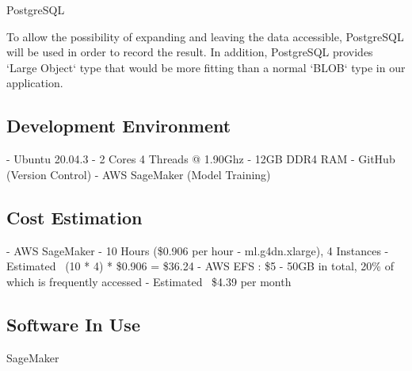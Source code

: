 \documentclass[conference]{IEEEtran}
\begin{document}
\begin{center}
PostgreSQL
\end{center}
To allow the possibility of expanding and leaving the data accessible, PostgreSQL will be used in order to record the result. In addition, PostgreSQL provides `Large Object` type that would be more fitting than a normal `BLOB` type in our application.

\subsection{Development Environment}
\noindent
- Ubuntu 20.04.3
\newline
- 2 Cores 4 Threads @ 1.90Ghz
\newline
- 12GB DDR4 RAM
\newline
- GitHub (Version Control)
\newline
- AWS SageMaker (Model Training)
  
\subsection{Cost Estimation}
\noindent
- AWS SageMaker
\newline
- 10 Hours (\$0.906 per hour - ml.g4dn.xlarge), 4 Instances
\newline
- Estimated ~(10 * 4) * \$0.906 = \$36.24
\newline
\newline
- AWS EFS : \$5
\newline
- 50GB in total, 20\% of which is frequently accessed
\newline
- Estimated ~\$4.39 per month
  
\subsection{Software In Use}

\begin{center}
SageMaker
\end{center}
\end{document}
